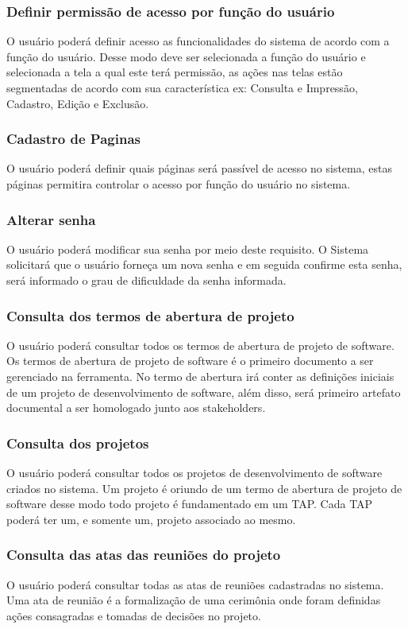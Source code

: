 \documentclass{acm_proc_article-sp}
\begin{document}
\subsubsection{Definir permissão de acesso por função do usuário}
O usuário poderá definir acesso as funcionalidades do sistema de acordo com a função do usuário. Desse modo deve ser selecionada a função do usuário e selecionada a tela a qual este terá permissão, as ações nas telas estão segmentadas de acordo com sua característica ex: Consulta e Impressão, Cadastro, Edição e Exclusão. 

\subsubsection{Cadastro de Paginas}
O usuário poderá definir quais páginas será passível de acesso no sistema, estas páginas permitira controlar o acesso por função do usuário no sistema.

\subsubsection{Alterar senha}
O usuário poderá modificar sua senha por meio deste requisito. O Sistema solicitará que o usuário forneça um nova senha e em seguida confirme esta senha, será informado o grau de dificuldade da senha informada.

\subsubsection{Consulta dos termos de abertura de projeto}
O usuário poderá consultar todos os termos de abertura de projeto de software. Os termos de abertura de projeto de software é o primeiro documento a ser gerenciado na ferramenta. No termo de abertura irá conter as definições iniciais de um projeto de desenvolvimento de software, além disso, será primeiro artefato documental a ser homologado junto aos stakeholders.

\subsubsection{Consulta dos projetos}
O usuário poderá consultar todos os projetos de desenvolvimento de software criados no sistema. Um projeto é oriundo de um termo de abertura de projeto de software desse modo todo projeto é fundamentado em um TAP. Cada TAP poderá ter um, e somente um, projeto associado ao mesmo.

\subsubsection{Consulta das atas das reuniões do projeto}
O usuário poderá consultar todas as atas de reuniões cadastradas no sistema. Uma ata de reunião é a formalização de uma cerimônia onde foram definidas ações consagradas e tomadas de decisões no projeto.
\end{document}

